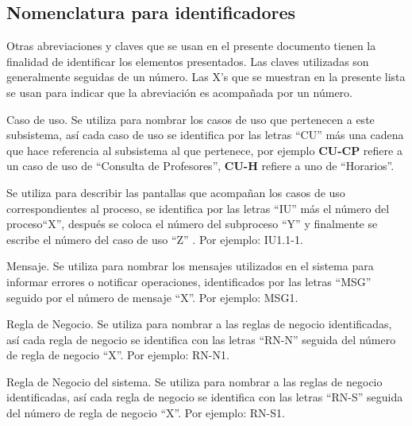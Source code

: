 \subsection{Nomenclatura para identificadores}\label{ssec:nomenclatura}

Otras abreviaciones y claves que se usan en el presente documento tienen la finalidad de identificar los elementos presentados. Las claves utilizadas son generalmente seguidas de un número. Las X’s que se muestran en la presente lista se usan para indicar que la abreviación es acompañada por un número.

\begin{description}
	
	 Caso de uso. Se utiliza para nombrar los casos de uso que pertenecen a este subsistema, así cada caso de uso se identifica por las letras ``CU'' más una cadena que hace referencia al subsistema al que pertenece, por ejemplo \textbf{CU-CP} refiere a un caso de uso de ``Consulta de Profesores'', \textbf{CU-H} refiere a uno de ``Horarios''.
	
	 Se utiliza para describir las pantallas que acompañan los casos de uso correspondientes al proceso, se identifica por las letras ``IU'' más el número del proceso``X'', después se coloca el número del subproceso ``Y'' y finalmente se escribe el número del caso de uso ``Z'' . Por ejemplo: IU1.1-1.

	 Mensaje. Se utiliza para nombrar los mensajes utilizados en el sistema para informar errores o notificar operaciones, identificados por las letras ``MSG'' seguido por el número de mensaje ``X''. Por ejemplo: MSG1.
	
	 Regla de Negocio. Se utiliza para nombrar a las reglas de negocio identificadas, así cada regla de negocio se identifica con las letras ``RN-N'' seguida del número de regla de negocio ``X''. Por ejemplo: RN-N1.
	
	 Regla de Negocio del sistema. Se utiliza para nombrar a las reglas de negocio identificadas, así cada regla de negocio se identifica con las letras ``RN-S'' seguida del número de regla de negocio ``X''. Por ejemplo: RN-S1.	
		
\end{description}